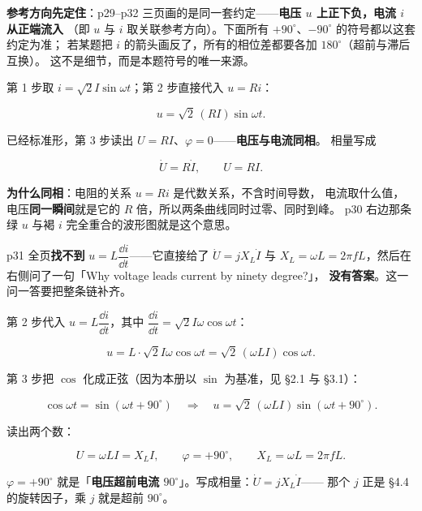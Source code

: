\documentclass[11pt]{ctexart}
\begin{document}
\textbf{参考方向先定住}：p29--p32 三页画的是同一套约定——\textbf{电压 $u$ 上正下负，电流 $i$ 从正端流入}
（即 $u$ 与 $i$ 取关联参考方向）。下面所有 $+90^\circ$、$-90^\circ$ 的符号都以这套约定为准；
若某题把 $i$ 的箭头画反了，所有的相位差都要各加 $180^\circ$（超前与滞后互换）。
这不是细节，而是本题符号的唯一来源。


第 1 步取 $i=\sqrt2I\sin\omega t$；第 2 步直接代入 $u=Ri$：

\[ u=\sqrt2\,(RI)\sin\omega t . \]

已经标准形，第 3 步读出 $U=RI$、$\varphi=0$——\textbf{电压与电流同相}。
相量写成

\[ \dot U=R\dot I ,\qquad U=RI . \]

\textbf{为什么同相}：电阻的关系 $u=Ri$ 是代数关系，不含时间导数，
电流取什么值，电压\textbf{同一瞬间}就是它的 $R$ 倍，所以两条曲线同时过零、同时到峰。
p30 右边那条绿 $u$ 与褐 $i$ 完全重合的波形图就是这个意思。



p31 全页\textbf{找不到} $u=L\dfrac{\dd i}{\dd t}$——它直接给了 $\dot U=jX_L\dot I$ 与
$X_L=\omega L=2\pi fL$，然后在右侧问了一句「Why voltage leads current by ninety degree?」，
\textbf{没有答案}。这一问一答要把整条链补齐。

第 2 步代入 $u=L\dfrac{\dd i}{\dd t}$，其中 $\dfrac{\dd i}{\dd t}=\sqrt2I\omega\cos\omega t$：

\[ u=L\cdot\sqrt2I\omega\cos\omega t=\sqrt2\,(\omega LI)\cos\omega t . \]

第 3 步把 $\cos$ 化成正弦（因为本册以 $\sin$ 为基准，见 §2.1 与 §3.1）：

\[ \cos\omega t=\sin\left(\omega t+90^\circ\right)
   \quad\Longrightarrow\quad
   u=\sqrt2\,(\omega LI)\sin\left(\omega t+90^\circ\right) . \]

读出两个数：

\[ U=\omega LI=X_LI ,\qquad \varphi=+90^\circ ,\qquad X_L=\omega L=2\pi fL . \]

$\varphi=+90^\circ$ 就是「\textbf{电压超前电流 $90^\circ$}」。写成相量：$\dot U=jX_L\dot I$——
那个 $j$ 正是 §4.4 的旋转因子，乘 $j$ 就是超前 $90^\circ$。
\end{document}
